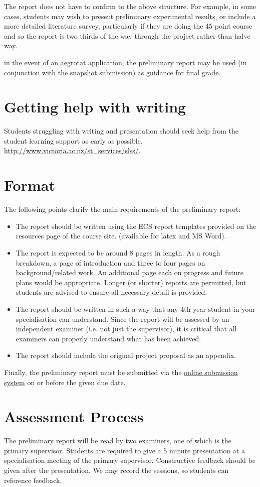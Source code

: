The report does not have to confirm to the above structure.
For example, in some cases, students may wish to present preliminary
experimental results, or include a more detailed literature survey, 
particularly if they are doing the 45 point course and so the report
is two thirds of the way through the project rather than halve way.

 in the event of an aegrotat application, the preliminary
report may be used (in conjunction with the snapshot submission) as guidance 
for final grade.

\section{Getting help with writing}
Students struggling with writing and presentation should seek help from the student 
learning support as early as possible.
{\footnotesize \url{http://www.victoria.ac.nz/st_services/slss/}}.


\section{Format}
The following points clarify the main requirements of the preliminary
report:
\begin{itemize}
\item The report should be written using the ECS report templates provided 
on the resources page of the course site.
(available for latex and MS Word).
\item The report is expected to be around 8 pages in length. As a rough
breakdown, a page of introduction and three to four pages on
background/related work.  An additional page each on progress
and future plans would be appropriate. Longer (or shorter) reports are
permitted, but students are advised to ensure all necessary detail is provided.
\item The report should be written in such a way that any 4th year student in your specialisation
  can understand.  Since the report will be assessed by an independent
  examiner (i.e. not just the supervisor), it is critical that all
  examiners can properly understand what has been achieved.
\item The report should include the original project proposal as an
  appendix.
\end{itemize}
Finally, the preliminary report must be submitted via the \href{https://apps.ecs.vuw.ac.nz/submit/}{online
  submission system} on or before the given due date.


\section{Assessment Process}

The preliminary report will be read by two examiners, one of
which is the primary supervisor. Students are required to give a 5 minute
presentation at a specialisation meeting of the primary supervisor.
Constructive feedback should be given after the presentation.
We may record the sessions, so students can reference feedback.


